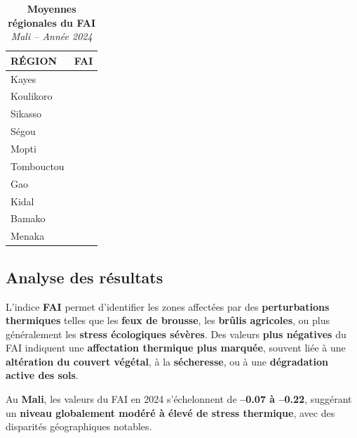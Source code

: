 \documentclass[
]{book}
\begin{document}
\begin{table}[!t]
\caption*{
{\large \textbf{Moyennes régionales du FAI}} \\ 
{\small \emph{Mali -- Année 2024}}
} 
\fontsize{12.0pt}{14.4pt}\selectfont
\begin{tabular*}{\linewidth}{@{\extracolsep{\fill}}lr}
\toprule
{RÉGION} & {FAI} \\ 
\midrule\addlinespace[2.5pt]
Kayes & {\cellcolor[HTML]{F6583D}{\textcolor[HTML]{FFFFFF}{-0.14}}} \\ 
Koulikoro & {\cellcolor[HTML]{FD9B7C}{\textcolor[HTML]{000000}{-0.17}}} \\ 
Sikasso & {\cellcolor[HTML]{F96144}{\textcolor[HTML]{FFFFFF}{-0.14}}} \\ 
Ségou & {\cellcolor[HTML]{FCB69B}{\textcolor[HTML]{000000}{-0.18}}} \\ 
Mopti & {\cellcolor[HTML]{FDCAB4}{\textcolor[HTML]{000000}{-0.19}}} \\ 
Tombouctou & {\cellcolor[HTML]{FECCB7}{\textcolor[HTML]{000000}{-0.19}}} \\ 
Gao & {\cellcolor[HTML]{FFF5F0}{\textcolor[HTML]{000000}{-0.22}}} \\ 
Kidal & {\cellcolor[HTML]{FFECE3}{\textcolor[HTML]{000000}{-0.21}}} \\ 
Bamako & {\cellcolor[HTML]{67000D}{\textcolor[HTML]{FFFFFF}{-0.07}}} \\ 
Menaka & {\cellcolor[HTML]{FDC6AF}{\textcolor[HTML]{000000}{-0.19}}} \\ 
\bottomrule
\end{tabular*}
\end{table}

\subsection{Analyse des résultats}\label{analyse-des-ruxe9sultats-7}

L'indice \textbf{FAI} permet d'identifier les zones affectées par des \textbf{perturbations thermiques} telles que les \textbf{feux de brousse}, les \textbf{brûlis agricoles}, ou plus généralement les \textbf{stress écologiques sévères}. Des valeurs \textbf{plus négatives} du FAI indiquent une \textbf{affectation thermique plus marquée}, souvent liée à une \textbf{altération du couvert végétal}, à la \textbf{sécheresse}, ou à une \textbf{dégradation active des sols}.

Au \textbf{Mali}, les valeurs du FAI en 2024 s'échelonnent de \textbf{--0.07 à --0.22}, suggérant un \textbf{niveau globalement modéré à élevé de stress thermique}, avec des disparités géographiques notables.
\end{document}
